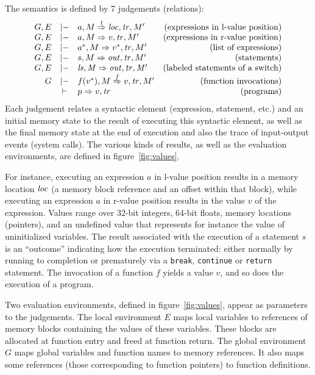 \documentclass[namedreferences]{kluwer}
\begin{document}
\begin{article}
The semantics is defined by 7 judgements (relations):
$$\begin{array}{rclr}
G, E & |- & a, M \stackrel{l}{\Rightarrow} {\it loc}, {\it tr}, M' & \mbox{(expressions in l-value position)} \\
G, E & |- & a , M \Rightarrow v, {\it tr}, M' & \mbox{(expressions in r-value position)} \\
G, E & |- & a^*, M \Rightarrow v^*, {\it tr}, M' & \mbox{(list of expressions)}\\
G, E & |- & s, M \Rightarrow \mathit{out}, {\it tr}, M' & \mbox{(statements)} \\
G, E & |- & \it ls, M \Rightarrow \mathit{out}, {\it tr}, M' & \mbox{(labeled statements of a switch)} \\
G    & |- & f(v^*), M \stackrel{f}{\Rightarrow} v, {\it tr}, M' & \mbox{(function invocations)} \\
     & \vdash & p \Rightarrow v, {\it tr} &  \mbox{(programs)}
\end{array}$$
Each judgement relates a syntactic element (expression, statement,
etc.) and an initial memory state to the result of executing this
syntactic element, as well as the final memory state at the end of
execution and also the trace of input-output events (system calls). 
 The various kinds of results, as well as the evaluation
environments, are defined in figure~\ref{fig:values}.



For instance, executing an expression $a$ in l-value position results in a
memory location ${\it loc}$ (a memory block reference and an offset within that
block), while executing an expression $a$ in r-value position results in
the value $v$ of the expression.  Values range over 32-bit integers,
64-bit floats, memory locations (pointers), and an undefined value
that represents for instance the value of uninitialized variables.
The result associated with the execution of a statement $s$ is an
``outcome'' indicating how the execution terminated: either normally
by running to completion or prematurely via a {\tt break}, {\tt continue} or
{\tt return} statement.
The invocation of a function $f$ yields a value $v$, and so does the execution 
of a program.

Two evaluation environments, defined in figure~\ref{fig:values},
appear as parameters to the judgements.  The local environment $E$ maps
local variables to references of memory blocks containing the values
of these variables.  These blocks are allocated at function entry and
freed at function return.  The global environment $G$ maps global
variables and function names to memory references.  It also maps
some references (those corresponding to function pointers) to function
definitions.


\end{article}
\end{document}
